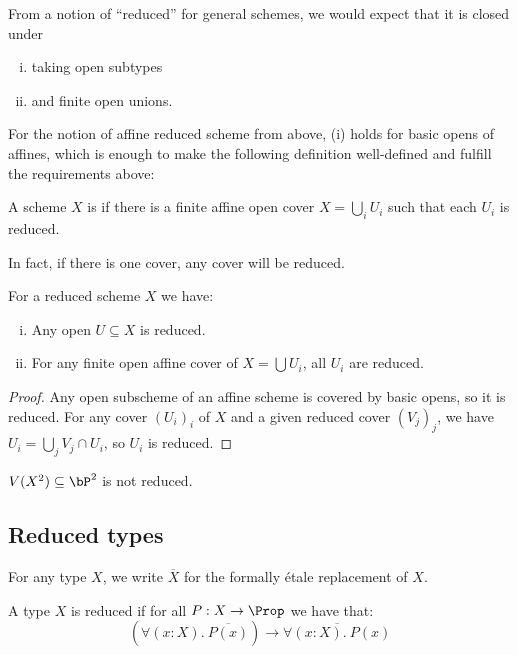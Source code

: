From a notion of ``reduced'' for general schemes, we would expect that it is closed under
\begin{enumerate}[(i)]
\item taking open subtypes
\item and finite open unions.
\end{enumerate}

For the notion of affine reduced scheme from above, (i) holds for basic opens of affines,
which is enough to make the following definition well-defined and fulfill the requirements above:

\begin{definition}
  A scheme $X$ is  if there is a finite affine open cover $X=\bigcup_i U_i$ such that each $U_i$ is reduced.
\end{definition}

In fact, if there is one cover, any cover will be reduced.

\begin{remark}
  For a reduced scheme $X$ we have:
  \begin{enumerate}[(i)]
  \item Any open $U\subseteq X$ is reduced.
  \item For any finite open affine cover of $X=\bigcup U_i$, all $U_i$ are reduced.
  \end{enumerate}
\end{remark}

\begin{proof}
  Any open subscheme of an affine scheme is covered by basic opens, so it is reduced.
  For any cover $(U_i)_i$ of $X$ and a given reduced cover $(V_j)_j$, we have $U_i=\bigcup_j V_j\cap U_i$, so $U_i$ is reduced.
\end{proof}

\begin{example}
  $V(X^2)\subseteq \bP^2$ is not reduced.
\end{example}


\subsection{Reduced types}

For any type $X$, we write $\overline{X}$ for the formally étale replacement of $X$.

\begin{definition}
A type $X$ is reduced if for all $P:X\to \Prop$ we have that:
\[(\forall(x:X).\ \overline{P(x)}) \to \overline{\forall(x:X).\ P(x)}\]
\end{definition}

